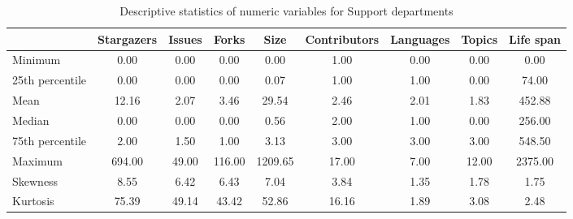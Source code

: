 \begin{table}
\centering
\caption{Descriptive statistics of numeric variables for Support departments}
\label{tab:Support_departments}
\begin{tabular}{lcccccccc}
\toprule
{} &  Stargazers &  Issues &   Forks &     Size &  Contributors &  Languages &  Topics &  Life span \\
\midrule
Minimum         &        0.00 &    0.00 &    0.00 &     0.00 &          1.00 &       0.00 &    0.00 &       0.00 \\
25th percentile &        0.00 &    0.00 &    0.00 &     0.07 &          1.00 &       1.00 &    0.00 &      74.00 \\
Mean            &       12.16 &    2.07 &    3.46 &    29.54 &          2.46 &       2.01 &    1.83 &     452.88 \\
Median          &        0.00 &    0.00 &    0.00 &     0.56 &          2.00 &       1.00 &    0.00 &     256.00 \\
75th percentile &        2.00 &    1.50 &    1.00 &     3.13 &          3.00 &       3.00 &    3.00 &     548.50 \\
Maximum         &      694.00 &   49.00 &  116.00 &  1209.65 &         17.00 &       7.00 &   12.00 &    2375.00 \\
Skewness        &        8.55 &    6.42 &    6.43 &     7.04 &          3.84 &       1.35 &    1.78 &       1.75 \\
Kurtosis        &       75.39 &   49.14 &   43.42 &    52.86 &         16.16 &       1.89 &    3.08 &       2.48 \\
\bottomrule
\end{tabular}
\end{table}
